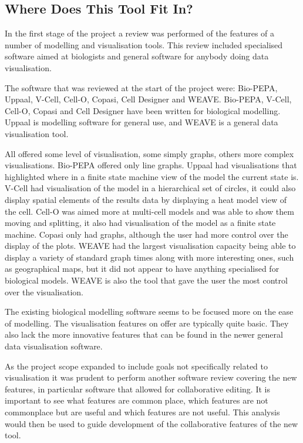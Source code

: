 \subsection{Where Does This Tool Fit In?}

In the first stage of the project a review was performed of the features of a number of modelling and visualisation tools.  This review included specialised software aimed at biologists and general software for anybody doing data visualisation.

The software that was reviewed at the start of the project were: Bio-PEPA, Uppaal, V-Cell, Cell-O, Copasi, Cell Designer and WEAVE.  Bio-PEPA, V-Cell, Cell-O, Copasi and Cell Designer have been written for biological modelling.  Uppaal is modelling software for general use, and WEAVE is a general data visualisation tool.

All offered some level of visualisation, some simply graphs, others more complex visualisations.  Bio-PEPA offered only line graphs.  Uppaal had visualisations that highlighted where in a finite state machine view of the model the current state is.  V-Cell had visualisation of the model in a hierarchical set of circles, it could also display spatial elements of the results data by displaying a heat model view of the cell.  Cell-O was aimed more at multi-cell models and was able to show them moving and splitting, it also had visualisation of the model as a finite state machine.  Copasi only had graphs, although the user had more control over the display of the plots.  WEAVE had the largest visualisation capacity being able to display a variety of standard graph times along with more interesting ones, such as geographical maps, but it did not appear to have anything specialised for biological models.  WEAVE is also the tool that gave the user the most control over the visualisation.

The existing biological modelling software seems to be focused more on the ease of modelling.  The visualisation features on offer are typically quite basic.  They also lack the more innovative features that can be found in the newer general data visualisation software.

As the project scope expanded to include goals not specifically related to visualisation it was prudent to perform another software review covering the new features, in particular software that allowed for collaborative editing.  It is important to see what features are common place, which features are not commonplace but are useful and which features are not useful. This analysis would then be used to guide development of the collaborative features of the new tool.

